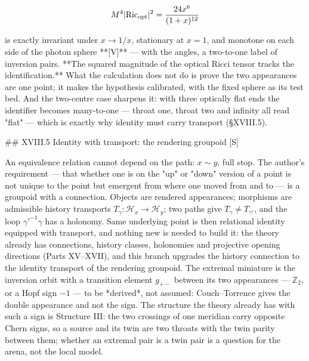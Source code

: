 $$M^4|{\rm Ric}_{\rm opt}|^2 = \frac{24x^6}{(1+x)^{12} }$$

is exactly invariant under $x\to1/x$, stationary at $x = 1$, and monotone on each side of the photon sphere **[V]** — with the angles, a two-to-one label of inversion pairs. **The squared magnitude of the optical Ricci tensor tracks the identification.** What the calculation does not do is prove the two appearances are one point; it makes the hypothesis calibrated, with the fixed sphere as its test bed. And the two-centre case sharpens it: with three optically flat ends the identifier becomes many-to-one — throat one, throat two and infinity all read "flat" — which is exactly why identity must carry transport (§XVIII.5).

## XVIII.5 Identity with transport: the rendering groupoid [S]

An equivalence relation cannot depend on the path: $x\sim y$, full stop. The author's requirement — that whether one is on the "up" or "down" version of a point is not unique to the point but emergent from where one moved from and to — is a groupoid with a connection. Objects are rendered appearances; morphisms are admissible history transports $T_\gamma:\mathcal H_x\to\mathcal H_y$; two paths give $T_\gamma\neq T_{\gamma'}$, and the loop $\gamma'^{-1}\gamma$ has a holonomy. Same underlying point is then relational identity equipped with transport, and nothing new is needed to build it: the theory already has connections, history classes, holonomies and projective opening directions (Parts XV–XVII), and this branch upgrades the history connection to the identity transport of the rendering groupoid. The extremal miniature is the inversion orbit with a transition element $g_{+-}$ between its two appearances — $\mathbb Z_2$, or a Hopf sign $-1$ — to be *derived*, not assumed: Couch–Torrence gives the double appearance and not the sign. The structure the theory already has with such a sign is Structure III: the two crossings of one meridian carry opposite Chern signs, so a source and its twin are two throats with the twin parity between them; whether an extremal pair is a twin pair is a question for the arena, not the local model.

